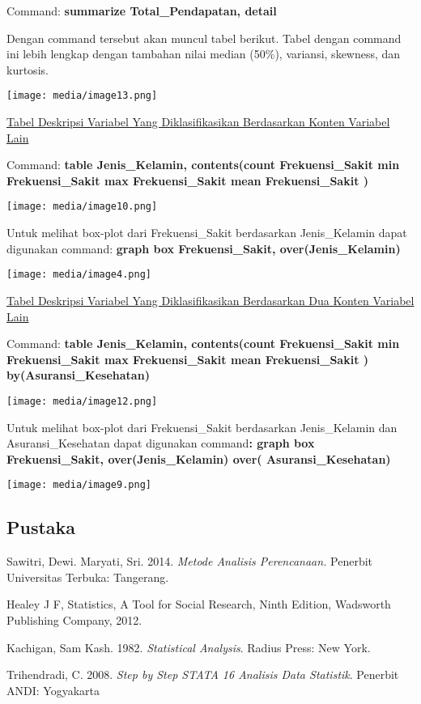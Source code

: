 \documentclass[
]{article}
\begin{document}
Command: \textbf{summarize Total\_Pendapatan, detail}

Dengan command tersebut akan muncul tabel berikut. Tabel dengan command
ini lebih lengkap dengan tambahan nilai median (50\%), variansi,
skewness, dan kurtosis.

\texttt{[image: media/image13.png]}

\uline{Tabel Deskripsi Variabel Yang Diklasifikasikan Berdasarkan Konten
Variabel Lain}

Command: \textbf{table Jenis\_Kelamin, contents(count Frekuensi\_Sakit
min Frekuensi\_Sakit max Frekuensi\_Sakit mean Frekuensi\_Sakit )}

\texttt{[image: media/image10.png]}

Untuk melihat box-plot dari Frekuensi\_Sakit berdasarkan Jenis\_Kelamin
dapat digunakan command: \textbf{graph box Frekuensi\_Sakit,
over(Jenis\_Kelamin)}

\texttt{[image: media/image4.png]}

\uline{Tabel Deskripsi Variabel Yang Diklasifikasikan Berdasarkan Dua
Konten Variabel Lain}

Command: \textbf{table Jenis\_Kelamin, contents(count Frekuensi\_Sakit
min Frekuensi\_Sakit max Frekuensi\_Sakit mean Frekuensi\_Sakit )
by(Asuransi\_Kesehatan)}

\texttt{[image: media/image12.png]}

Untuk melihat box-plot dari Frekuensi\_Sakit berdasarkan Jenis\_Kelamin
dan Asuransi\_Kesehatan dapat digunakan command\textbf{: graph box
Frekuensi\_Sakit, over(Jenis\_Kelamin) over( Asuransi\_Kesehatan)}

\texttt{[image: media/image9.png]}

\hypertarget{pustaka}{%
\subsection{Pustaka}\label{pustaka}}

Sawitri, Dewi. Maryati, Sri. 2014. \emph{Metode Analisis Perencanaan.}
Penerbit Universitas Terbuka: Tangerang.

Healey J F, Statistics, A Tool for Social Research, Ninth Edition,
Wadsworth Publishing Company, 2012.

Kachigan, Sam Kash. 1982. \emph{Statistical Analysis}. Radius Press: New
York.

Trihendradi, C. 2008. \emph{Step by Step STATA 16 Analisis Data
Statistik}. Penerbit ANDI: Yogyakarta
\end{document}
